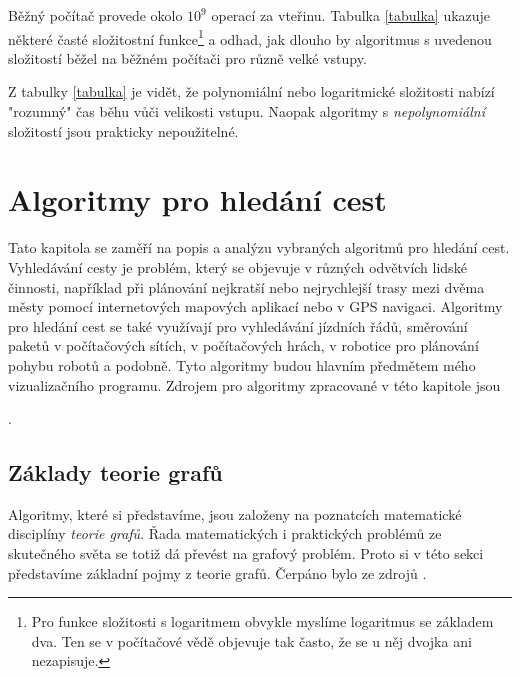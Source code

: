 \documentclass[12pt]{report}			%
\begin{document}
			Běžný počítač provede okolo $10^9$ operací za vteřinu. Tabulka \ref{tabulka} ukazuje některé časté složitostní funkce\footnote{Pro funkce složitosti s logaritmem obvykle myslíme logaritmus se základem dva. Ten se v počítačové vědě objevuje tak často, že se u něj dvojka ani nezapisuje.} a odhad, jak dlouho by algoritmus s uvedenou složitostí běžel na běžném počítači pro různě velké vstupy. %
			\cite{cerny}
			
			Z tabulky \ref{tabulka} je vidět, že polynomiální nebo logaritmické složitosti nabízí "rozumný" čas běhu vůči velikosti vstupu. Naopak algoritmy s \emph{nepolynomiální} složitostí jsou prakticky nepoužitelné. %
			
				
		\chapter{Algoritmy pro hledání cest}
		Tato kapitola se zaměří na popis a analýzu vybraných algoritmů pro hledání cest. Vyhledávání cesty je problém, který se objevuje v různých odvětvích lidské činnosti, například při plánování nejkratší nebo nejrychlejší trasy mezi dvěma městy pomocí internetových mapových aplikací nebo v GPS navigaci. Algoritmy pro hledání cest se také využívají pro vyhledávání jízdních řádů, směrování paketů v počítačových sítích, v počítačových hrách, v robotice pro plánování pohybu robotů a podobně. Tyto algoritmy budou hlavním předmětem mého vizualizačního programu. Zdrojem pro algoritmy zpracované v této kapitole jsou \cite{intro,pruvodce,cerny,garg,felner,uhlik,simic,carlos,patel_intro}
		
		.
		
			\section{Základy teorie grafů}
			Algoritmy, které si představíme, jsou založeny na  poznatcích matematické disciplíny \emph{teorie grafů}. Řada matematických i praktických problémů ze skutečného světa se totiž dá převést na grafový problém. Proto si v této sekci představíme základní pojmy z teorie grafů. Čerpáno bylo ze zdrojů \cite{pruvodce} \cite{zaklady} \cite{intro} \cite{kovar}.
			
\end{document}
